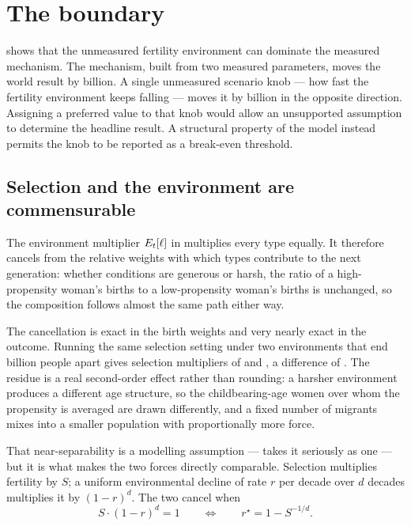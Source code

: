 \section{The boundary}
\label{sec:boundary}

 shows that the unmeasured fertility environment can dominate
the measured mechanism. The mechanism, built from two measured parameters, moves the \ProjectionEndYear{} world result by
\LadderMainstreamGain{} billion. A single unmeasured scenario knob --- how fast
the fertility environment keeps falling --- moves it by \LadderPressureLoss{}
billion in the opposite direction. Assigning a preferred value to that knob
would allow an unsupported assumption to determine the headline result. A
structural property of the model instead permits the knob to be reported as a
break-even threshold.

\subsection{Selection and the environment are commensurable}
\label{sec:separability}

The environment multiplier $E_t[\ell]$ in 
multiplies every type equally. It therefore cancels from the relative weights
with which types contribute to the next generation: whether conditions are
generous or harsh, the ratio of a high-propensity woman's births to a
low-propensity woman's births is unchanged, so the composition follows almost the
same path either way.

The cancellation is exact in the birth weights and very nearly exact in the
outcome. Running the same selection setting under two environments that end
\SeparabilityPopulationGap{} billion people apart gives selection multipliers of
\SeparabilityCalmEffect{} and \SeparabilityStressedEffect{}, a difference of
\SeparabilityGap{}. The residue is a real second-order effect rather than
rounding: a harsher environment produces a different age structure, so the
childbearing-age women over whom the propensity is averaged are drawn
differently, and a fixed number of migrants mixes into a smaller population with
proportionally more force.

That near-separability is a modelling assumption ---  takes
it seriously as one --- but it is what makes the two forces directly comparable.
Selection multiplies fertility by $S$; a uniform environmental decline of rate
$r$ per decade over $d$ decades multiplies it by $(1-r)^d$. The two cancel when
\begin{equation}
  S \cdot (1-r)^{d} = 1
  \qquad\Longleftrightarrow\qquad
  r^{\star} = 1 - S^{-1/d}.
  \label{eq:break-even}
\end{equation}


